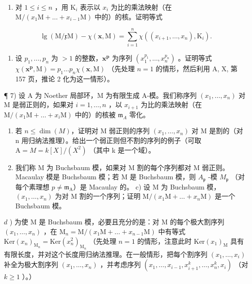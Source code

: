 \begin{enumerate}
\def\labelenumi{\alph{enumi})}
\setcounter{enumi}{3}
\tightlist
\item
  对 \(1 \leqslant i \leqslant n\) ，用 \(\mathrm{K}_i\) 表示以 \(x_i\) 为比的乘法映射（在 \(\mathrm{M}/(x_1\mathrm{M} + \ldots + x_{i-1}\mathrm{M})\) 中的）的核。证明等式
\end{enumerate}

\[
\lg (\mathrm{M} / \mathfrak {x} \mathrm{M}) - \chi (\mathbf {x}, \mathrm{M}) = \sum_ {i = 1} ^ {n} \chi ((x _ {i + 1}, \dots , x _ {n}), \mathrm{K} _ {i}).
\]

\begin{enumerate}
\def\labelenumi{\alph{enumi})}
\setcounter{enumi}{4}
\tightlist
\item
  设 \(p_1, \ldots, p_n\) 为 \(> 1\) 的整数，\(\mathbf{x}^{\mathbf{p}}\) 为序列 \((x_{1}^{p_1}, \ldots, x_n^{p_n})\) 。证明等式 \(\chi(\mathbf{x}^{\mathbf{p}}, \mathrm{M}) = p_1 \ldots p_n \chi(\mathbf{x}, \mathrm{M})\) （先处理 \(n = 1\) 的情形，然后利用 A, X, 第 157 页，推论 2 化为这一情形）。
\end{enumerate}

¶ 7) 设 A 为 Noether 局部环，M 为有限生成 A-模。我们称序列 \((x_1, \ldots, x_n)\) 对 M 是弱正则的，如果对 \(i = 1, \ldots, n\) ，以 \(x_{i+1}\) 为比的乘法映射（在 \(\mathrm{M}/(x_1\mathrm{M} + \ldots + x_i\mathrm{M})\) 中的）的核被 \(\mathfrak{m}_A\) 零化。

\begin{enumerate}
\def\labelenumi{\alph{enumi})}
\item
  若 \(n \leqslant \dim(M)\)，证明对 M 弱正则的序列 \((x_{1}, \ldots, x_{n})\) 对 M 是割的（对 n 用归纳法推理）。给出一个弱正则但不割的序列的例子（可取 \(\mathrm{A} = M = k[X]/(X^{2})\) （其中 k 是一个域）。
\item
  我们称 M 为 Buchsbaum 模，如果对 M 割的每个序列都对 M 弱正则。Macaulay 模是 Buchsbaum 模；若 M 是 Buchsbaum 模，则 \(A_{\mathfrak{p}}\) -模 \(M_{\mathfrak{p}}\) （对每个素理想 \(p \neq \mathfrak{m}_{\mathrm{A}}\)）是 Macaulay 的。 c) 设 M 为 Buchsbaum 模，\((x_{1}, \ldots, x_{n})\) 为对 M 割的一个序列；证明 \(\mathrm{M}/(x_{1}\mathrm{M} + \ldots + x_{n}\mathrm{M})\) 是一个 Buchsbaum 模。
\end{enumerate}

\(d\) ) 为使 M 是 Buchsbaum 模，必要且充分的是：对 M 的每个极大割序列 \((x_{1},\ldots ,x_{n})\) ，在 \(\mathrm{M}_n = \mathrm{M} / (x_1\mathrm{M} + \dots +x_{n - 1}\mathrm{M})\) 中有等式 \(\mathrm{Ker}(x_n)_{\mathrm{M}_n} = \mathrm{Ker}(x_n^2)_{\mathrm{M}_n}\) （先处理 \(n = 1\) 的情形，注意此时 \(\mathrm{Ker}(x_1)_{\mathrm{M}}\) 具有有限长度，并对这个长度用归纳法推理。在一般情形，把每个割序列 \((x_{1},\ldots ,x_{i})\) 补全为极大割序列 \((x_{1},\ldots ,x_{n})\) ，并考虑序列 \((x_{1},\ldots ,x_{i - 1},x_{i + 1}^{k},\ldots ,x_{n}^{k},x_{i})\) （对 \(k\geqslant 1\) ）。）

